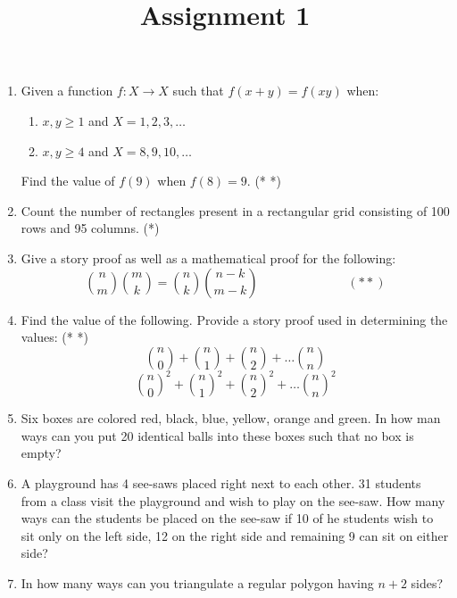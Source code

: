 \documentclass[a4paper]{article}
\title{Assignment 1}
\date{\displaydate{date}}
\begin{document}
\maketitle

\begin{enumerate}
\item Given a function $f:X \rightarrow X$ such that $f(x+y)=f(xy)$ when:
\begin{enumerate}
\item $x,y \geq 1$ and $X={1,2,3,\dots}$
\item $x,y \geq 4$ and $X={8,9,10,\dots}$
\end{enumerate}
Find the value of $f(9)$ when $f(8)=9$. (* *)

\item Count  the number of rectangles present in a rectangular grid consisting of 100 rows and 95 columns. (*)

\item Give a story proof as well as a mathematical proof for the following:
\begin{equation}
{n \choose m}{m \choose k} = {n \choose k} {{n-k} \choose {m-k}} \hspace{3cm}(* *)
\end{equation}

\item Find the value of the following. Provide a story proof used in determining the values: (* *)
\begin{equation}
{n \choose 0} + {n \choose 1} + {n \choose 2} + \dots {n \choose n}
\end{equation}
\begin{equation}
{n \choose 0}^2 + {n \choose 1}^2 + {n \choose 2}^2 + \dots {n \choose n}^2
\end{equation}
\item Six boxes are colored red, black, blue, yellow, orange and green. In how man ways can you put 20 identical balls into these boxes such that no box is empty?

\item A playground has 4 see-saws placed right next to each other. 31 students from a class visit the playground and wish to play on the see-saw. How many ways can the students be placed on the see-saw if 10 of he students wish to sit only on the left side, 12 on the right side and remaining 9 can sit on either side?

\item In how many ways can you triangulate a regular polygon having $n+2$ sides?


\end{enumerate}
\end{document}
